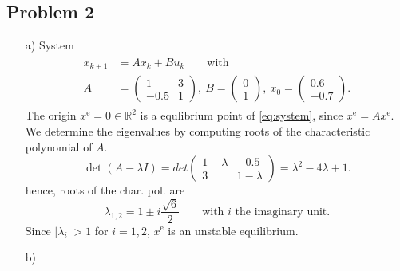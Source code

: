 \documentclass[]{article}
\newcommand{\xnull}{x_0}
\newcommand{\xk}{x_k}
\newcommand{\xeq}{x^{\mathrm{e}}}
\newcommand{\uk}{u_k}
\newcommand{\matricks}[4]{\begin{pmatrix}#1 & #2 \\ #3 & #4 \end{pmatrix}}
\newcommand{\xkplus}{x_{k+1}}
\newcommand{\vectortwo}[2]{\begin{pmatrix}
		#1 \\ #2
\end{pmatrix}}
\newcommand{\R}{\mathbb{R}}
\begin{document}
\subsection*{Problem 2}
		\begin{enumerate}
			\item[a)] System
					\begin{align}
					\begin{split} \label{eq:system}
						\xkplus &= A \xk + B \uk \qquad \text{with}\\
						A &= \matricks{1}{3}{-0.5}{1}, \ B = \vectortwo{0}{1},\ \xnull = \vectortwo{0.6}{-0.7}.
					\end{split}
					\end{align}
					The origin $ \xeq = 0 \in \R^2 $ is a equlibrium point of \eqref{eq:system}, since $ \xeq = A \xeq. $
					We determine the eigenvalues by computing roots of the characteristic polynomial of $ A $.
					\[ \det(A - \lambda I) = det\matricks{1-\lambda}{-0.5}{3}{1-\lambda} = \lambda^2 -4\lambda + 1. \]
					hence, roots of the char. pol. are
					\[ \lambda_{1,2} = 1 \pm i \frac{\sqrt{6}}{2} \qquad \text{with }i\text{ the imaginary unit.}\]
					Since $ |\lambda_i | > 1  $ for $ i=1,2 $, $ \xeq $ is an unstable equilibrium.
					
			\item[b)]
		\end{enumerate}	
\end{document}

